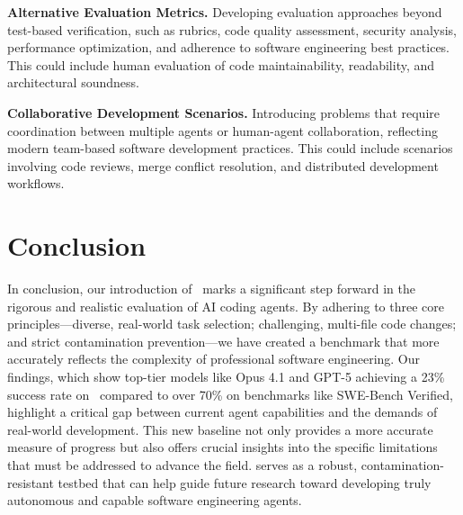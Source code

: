 \textbf{Alternative Evaluation Metrics.} Developing evaluation approaches beyond test-based verification, such as rubrics, code quality assessment, security analysis, performance optimization, and adherence to software engineering best practices. This could include human evaluation of code maintainability, readability, and architectural soundness.

\textbf{Collaborative Development Scenarios.} Introducing problems that require coordination between multiple agents or human-agent collaboration, reflecting modern team-based software development practices. This could include scenarios involving code reviews, merge conflict resolution, and distributed development workflows.

\section{Conclusion}

In conclusion, our introduction of \benchmarkname~marks a significant step forward in the rigorous and realistic evaluation of AI coding agents. By adhering to three core principles—diverse, real-world task selection; challenging, multi-file code changes; and strict contamination prevention—we have created a benchmark that more accurately reflects the complexity of professional software engineering. Our findings, which show top-tier models like Opus 4.1 and GPT-5 achieving a 23\% success rate on \benchmarkname~compared to over 70\% on benchmarks like SWE-Bench Verified, highlight a critical gap between current agent capabilities and the demands of real-world development. This new baseline not only provides a more accurate measure of progress but also offers crucial insights into the specific limitations that must be addressed to advance the field. \benchmarkname serves as a robust, contamination-resistant testbed that can help guide future research toward developing truly autonomous and capable software engineering agents.

\newpage


